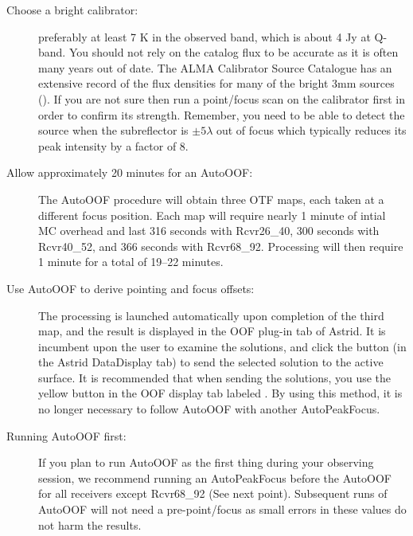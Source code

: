 \begin{description}
\item[Choose a bright calibrator:] preferably at least 7 K in the observed band, which
is about 4 Jy at Q-band. You should not rely on the catalog flux to be accurate
as it is often many years out of date.  The ALMA Calibrator Source Catalogue has
an extensive record of the flux densities for many of the bright 3mm sources
().
If you are not sure then run a point/focus scan on the calibrator first in order to
confirm its strength.  Remember, you need to be able to detect the source when
the subreflector is $\pm{5}\lambda$ out of focus which typically reduces its peak
intensity by a factor of 8.

\item[Allow approximately 20 minutes for an AutoOOF:] The AutoOOF procedure will
obtain three \gls{OTF} maps, each taken at a different focus position.  Each map
will require nearly 1 minute of intial \gls{MC} overhead and last 316 seconds
with Rcvr26\_40, 300 seconds with Rcvr40\_52, and 366 seconds with Rcvr68\_92.
Processing will then require 1 minute for a total of 19--22 minutes.

\newpage

\item[Use AutoOOF to derive pointing and focus offsets:] The processing is launched
automatically upon completion of the third map, and the result is displayed in the
OOF plug-in tab of Astrid. It is incumbent upon the user to examine the solutions,
and click the button (in the Astrid DataDisplay tab) to send the selected solution
to the active surface. It is recommended that when sending the solutions, you use
the yellow button in the OOF display tab labeled . By using this method, it is no longer necessary to
follow AutoOOF with another AutoPeakFocus.

\item[Running AutoOOF first:] If you plan to run AutoOOF as the first thing during
your observing session, we recommend running an AutoPeakFocus before the AutoOOF
for all receivers except Rcvr68\_92 (See next point). Subsequent runs of AutoOOF will
not need a pre-point/focus as small errors in these values do not harm the results.


\end{description}
